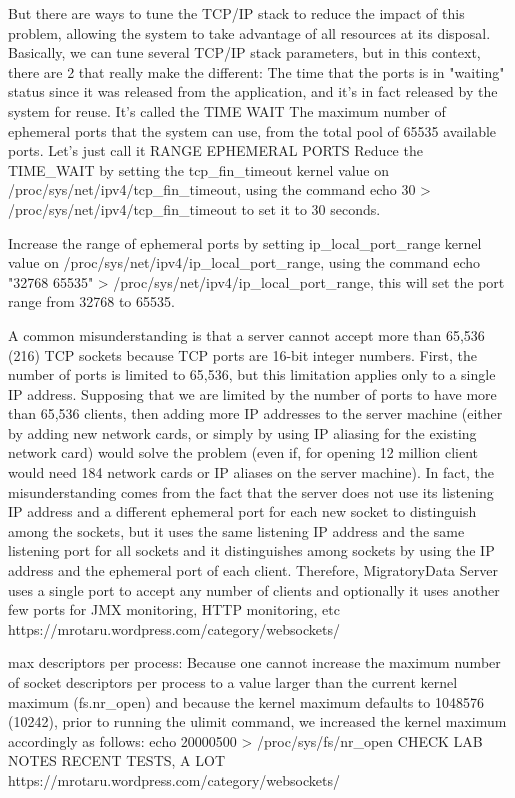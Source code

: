 \documentclass{uvamscse}
\begin{document}
But there are ways to tune the TCP/IP stack to reduce the impact of this problem, allowing the system to take advantage of all resources at its disposal. Basically, we can tune several TCP/IP stack parameters, but in this context, there are 2 that really make the different:
The time that the ports is in "waiting" status since it was released from the application, and it's in fact released by the system for reuse. It's called the TIME WAIT
The maximum number of ephemeral ports that the system can use, from the total pool of 65535 available ports. Let's just call it RANGE EPHEMERAL PORTS
Reduce the TIME\_WAIT by setting the tcp\_fin\_timeout kernel value on /proc/sys/net/ipv4/tcp\_fin\_timeout, using the command echo 30 > /proc/sys/net/ipv4/tcp\_fin\_timeout to set it to 30 seconds.

Increase the range of ephemeral ports by setting ip\_local\_port\_range kernel value on /proc/sys/net/ipv4/ip\_local\_port\_range, using the command echo "32768 65535" > /proc/sys/net/ipv4/ip\_local\_port\_range, this will set the port range from 32768 to 65535.

A common misunderstanding is that a server cannot accept more than 65,536 (216) TCP sockets because TCP ports are 16-bit integer numbers.
First, the number of ports is limited to 65,536, but this limitation applies only to a single IP address. Supposing that we are limited by the number of ports to have more than 65,536 clients, then adding more IP addresses to the server machine (either by adding new network cards, or simply by using IP aliasing for the existing network card) would solve the problem (even if, for opening 12 million client would need 184 network cards or IP aliases on the server machine).
In fact, the misunderstanding comes from the fact that the server does not use its listening IP address and a different ephemeral port for each new socket to distinguish among the sockets, but it uses the same listening IP address and the same listening port for all sockets and it distinguishes among sockets by using the IP address and the ephemeral port of each client. Therefore, MigratoryData Server uses a single port to accept any number of clients and optionally it uses another few ports for JMX monitoring, HTTP monitoring, etc
https://mrotaru.wordpress.com/category/websockets/

max descriptors per process:
Because one cannot increase the maximum number of socket descriptors per process to a value larger than the current kernel maximum (fs.nr\_open) and because the kernel maximum defaults to 1048576 (10242), prior to running the ulimit command, we increased the kernel maximum accordingly as follows:
echo 20000500 > /proc/sys/fs/nr\_open
CHECK LAB NOTES RECENT TESTS, A LOT
https://mrotaru.wordpress.com/category/websockets/
\end{document}
